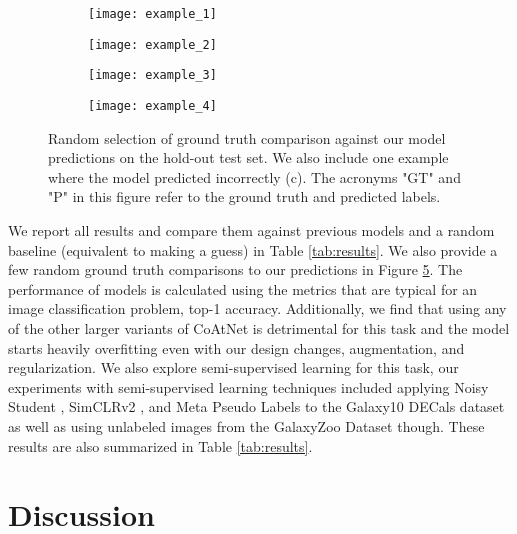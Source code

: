\documentclass{article} \usepackage{iclr2023_conference,times}
\begin{document}
\begin{figure}[ht]
  \centering
  \begin{subfigure}[t]{0.23\textwidth}
    \centering
    \texttt{[image: example\_1]}
    \caption{}
    \label{fig:example1}
  \end{subfigure}
  \begin{subfigure}[t]{0.23\textwidth}
    \centering
    \texttt{[image: example\_2]}
    \caption{}
    \label{fig:example2}
  \end{subfigure}
  \begin{subfigure}[t]{0.23\textwidth}
    \centering
    \texttt{[image: example\_3]}
    \caption{}
    \label{fig:example3}
  \end{subfigure}
  \begin{subfigure}[t]{0.23\textwidth}
    \centering
    \texttt{[image: example\_4]}
    \caption{}
    \label{fig:example4}
  \end{subfigure}
  \caption{Random selection of ground truth comparison against our model predictions on the hold-out test set. We also include one example where the model predicted incorrectly (c). The acronyms "GT" and "P" in this figure refer to the ground truth and predicted labels.}
  \label{fig:examples}
\end{figure}

We report all results and compare them against previous models and a random baseline (equivalent to making a guess) in Table \ref{tab:results}. We also provide a few random ground truth comparisons to our predictions in Figure \ref{fig:examples}. The performance of models is calculated using the metrics that are typical for an image classification problem, top-1 accuracy. Additionally, we find that using any of the other larger variants of CoAtNet is detrimental for this task and the model starts heavily overfitting even with our design changes, augmentation, and regularization. We also explore semi-supervised learning for this task, our experiments with semi-supervised learning techniques included applying Noisy Student \citep{xie2020self}, SimCLRv2 \citep{NEURIPS2020_fcbc95cc}, and Meta Pseudo Labels \citep{Pham_2021_CVPR} to the Galaxy10 DECals dataset as well as using unlabeled images from the GalaxyZoo Dataset though. These results are also summarized in Table \ref{tab:results}.

\section{Discussion}
\label{Discussion}
\end{document}
